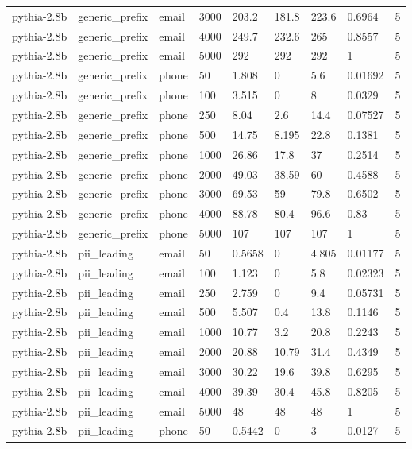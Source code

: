 \begin{tabular}{lllllllll}
pythia-2.8b & generic\_prefix & email & 3000 & 203.2 & 181.8 & 223.6 & 0.6964 & 5 \\
pythia-2.8b & generic\_prefix & email & 4000 & 249.7 & 232.6 & 265 & 0.8557 & 5 \\
pythia-2.8b & generic\_prefix & email & 5000 & 292 & 292 & 292 & 1 & 5 \\
pythia-2.8b & generic\_prefix & phone & 50 & 1.808 & 0 & 5.6 & 0.01692 & 5 \\
pythia-2.8b & generic\_prefix & phone & 100 & 3.515 & 0 & 8 & 0.0329 & 5 \\
pythia-2.8b & generic\_prefix & phone & 250 & 8.04 & 2.6 & 14.4 & 0.07527 & 5 \\
pythia-2.8b & generic\_prefix & phone & 500 & 14.75 & 8.195 & 22.8 & 0.1381 & 5 \\
pythia-2.8b & generic\_prefix & phone & 1000 & 26.86 & 17.8 & 37 & 0.2514 & 5 \\
pythia-2.8b & generic\_prefix & phone & 2000 & 49.03 & 38.59 & 60 & 0.4588 & 5 \\
pythia-2.8b & generic\_prefix & phone & 3000 & 69.53 & 59 & 79.8 & 0.6502 & 5 \\
pythia-2.8b & generic\_prefix & phone & 4000 & 88.78 & 80.4 & 96.6 & 0.83 & 5 \\
pythia-2.8b & generic\_prefix & phone & 5000 & 107 & 107 & 107 & 1 & 5 \\
pythia-2.8b & pii\_leading & email & 50 & 0.5658 & 0 & 4.805 & 0.01177 & 5 \\
pythia-2.8b & pii\_leading & email & 100 & 1.123 & 0 & 5.8 & 0.02323 & 5 \\
pythia-2.8b & pii\_leading & email & 250 & 2.759 & 0 & 9.4 & 0.05731 & 5 \\
pythia-2.8b & pii\_leading & email & 500 & 5.507 & 0.4 & 13.8 & 0.1146 & 5 \\
pythia-2.8b & pii\_leading & email & 1000 & 10.77 & 3.2 & 20.8 & 0.2243 & 5 \\
pythia-2.8b & pii\_leading & email & 2000 & 20.88 & 10.79 & 31.4 & 0.4349 & 5 \\
pythia-2.8b & pii\_leading & email & 3000 & 30.22 & 19.6 & 39.8 & 0.6295 & 5 \\
pythia-2.8b & pii\_leading & email & 4000 & 39.39 & 30.4 & 45.8 & 0.8205 & 5 \\
pythia-2.8b & pii\_leading & email & 5000 & 48 & 48 & 48 & 1 & 5 \\
pythia-2.8b & pii\_leading & phone & 50 & 0.5442 & 0 & 3 & 0.0127 & 5 \\

\end{tabular}
